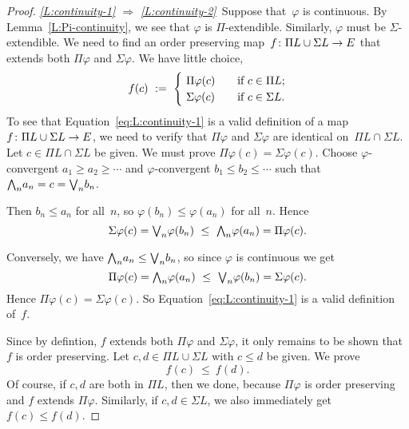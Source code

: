 \begin{proof}
\noindent
\emph{\ref{L:continuity-1}
$\Longrightarrow$
\ref{L:continuity-2}}\ 
Suppose that~$\varphi$ is continuous.
By Lemma~\ref{L:Pi-continuity},
we see that $\varphi$ is $\Pi$-extendible.
Similarly, $\varphi$ must be $\Sigma$-extendible.
We need to find an order preserving map~$f\colon \Pi L \cup \Sigma L \rightarrow E$
that extends both $\Pi\varphi$ and $\Sigma\varphi$.
We have little choice,
\begin{equation}
\label{eq:L:continuity-1}
f(c) \ \eqdf \ 
\begin{cases}
\ \Pi\varphi(c) \quad& \text{if }c\in \Pi L;\\
\ \Sigma\varphi(c) \quad& \text{if }c\in \Sigma L.
\end{cases}
\end{equation}
To see that Equation~\eqref{eq:L:continuity-1}
is a valid definition of a 
map $f\colon \Pi L \cup \Sigma L \rightarrow E$,
we need to verify that $\Pi\varphi$ and $\Sigma\varphi$
are identical on~$\Pi L \cap \Sigma L$.
Let $c\in \Pi L \cap \Sigma L$
be given.
We must prove $\Pi\varphi(c) = \Sigma\varphi(c)$.
Choose $\varphi$-convergent
$a_1 \geq a_2 \geq \dotsb$ and
$\varphi$-convergent
$b_1 \leq b_2 \leq \dotsb$
such that $\textstyle{\bigwedge}_n a_n =c= \textstyle{\bigvee}_n b_n$.

Then $b_n \leq a_n$ for all~$n$, so
$\varphi(b_n)\leq \varphi(a_n)$ for all~$n$.
Hence
\begin{equation*}
\Sigma\varphi(c)
=\textstyle{\bigvee}_n \varphi(b_n)
\ \leq\ \textstyle{\bigwedge}_n \varphi(a_n)
=\Pi\varphi(c).
\end{equation*}

Conversely,
we have $\textstyle{\bigwedge}_n a_n \leq \textstyle{\bigvee}_n b_n$,
so since $\varphi$ is continuous we get
\begin{equation*}
\Pi\varphi(c)
=\textstyle{\bigwedge}_n \varphi(a_n)
\ \leq\ \textstyle{\bigvee}_n \varphi(b_n)
=\Sigma\varphi(c).
\end{equation*}
Hence $\Pi\varphi(c)=\Sigma\varphi(c)$.
So Equation~\eqref{eq:L:continuity-1}
is a valid definition of~$f$.

Since by defintion,
$f$ extends both $\Pi\varphi$ and $\Sigma\varphi$,
it only remains to be shown that~$f$ is order preserving.
Let $c,d\in \Pi L \cup \Sigma L$
with $c\leq d$ be given.
We prove
\begin{equation*}
f(c)\ \leq\  f(d).
\end{equation*}
Of course,
if $c,d$ are both in $\Pi L$,
then we done,
because $\Pi \varphi$
is order preserving 
and $f$ extends $\Pi\varphi$.
Similarly, if $c,d\in\Sigma L$, 
we also immediately get $f(c)\leq f(d)$.


\end{proof}
